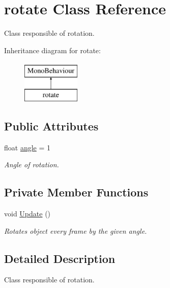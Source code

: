 \hypertarget{classrotate}{}\section{rotate Class Reference}
\label{classrotate}


Class responsible of rotation.  


Inheritance diagram for rotate\+:\begin{figure}[H]
\begin{center}
\leavevmode
\includegraphics[height=2.000000cm]{classrotate}
\end{center}
\end{figure}
\subsection*{Public Attributes}
\begin{DoxyCompactItemize}
\item 
float \mbox{\hyperlink{classrotate_aad45a318094d5f91273252034e63b78b}{angle}} = 1
\begin{DoxyCompactList}\small\item\em Angle of rotation. \end{DoxyCompactList}\end{DoxyCompactItemize}
\subsection*{Private Member Functions}
\begin{DoxyCompactItemize}
\item 
void \mbox{\hyperlink{classrotate_a4005d36825adc52547585541c3ddbd22}{Update}} ()
\begin{DoxyCompactList}\small\item\em Rotates object every frame by the given angle. \end{DoxyCompactList}\end{DoxyCompactItemize}


\subsection{Detailed Description}
Class responsible of rotation. 



